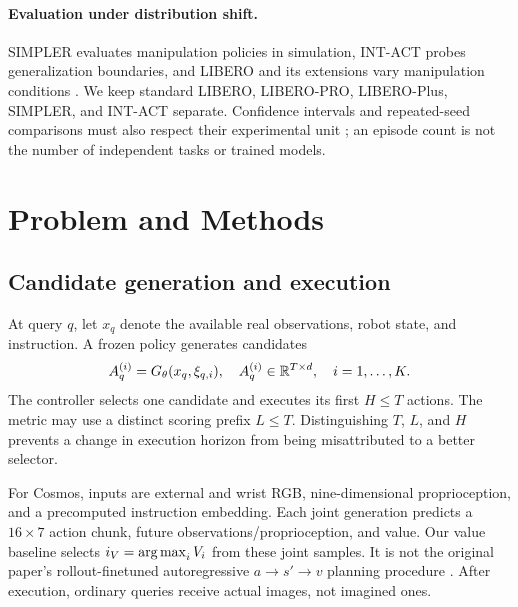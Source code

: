 \paragraph{Evaluation under distribution shift.}
SIMPLER evaluates manipulation policies in simulation, INT-ACT probes
generalization boundaries, and LIBERO and its extensions vary manipulation
conditions \citep{simpler,intact,libero,libero_pro,libero_plus}.
We keep standard LIBERO, LIBERO-PRO, LIBERO-Plus, SIMPLER, and INT-ACT
separate. Confidence intervals and repeated-seed comparisons must also
respect their experimental unit \citep{rliable}; an episode count is not
the number of independent tasks or trained models.

\section{Problem and Methods}
\subsection{Candidate generation and execution}
At query $q$, let $x_q$ denote the available real observations, robot state,
and instruction. A frozen policy generates candidates
\begin{equation}
A_q^{(i)}=G_\theta(x_q,\xi_{q,i}),\quad
A_q^{(i)}\in\mathbb{R}^{T\times d},\quad i=1,\ldots,K.
\end{equation}
The controller selects one candidate and executes its first $H\le T$
actions. The metric may use a distinct scoring prefix $L\le T$.
Distinguishing $T$, $L$, and $H$ prevents a change in execution horizon
from being misattributed to a better selector.

For Cosmos, inputs are external and wrist RGB, nine-dimensional proprioception,
and a precomputed instruction embedding. Each joint generation predicts a
$16\times7$ action chunk, future observations/proprioception, and value.
Our value baseline selects $i_V=\operatorname*{arg\,max}_i V_i$ from these joint samples.
It is not the original paper's rollout-finetuned autoregressive
$a\rightarrow s'\rightarrow v$ planning procedure \citep{cosmos_policy}.
After execution, ordinary queries receive actual images, not imagined ones.

